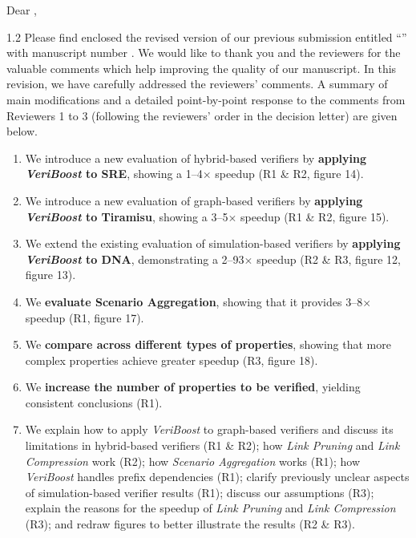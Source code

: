 Dear \printeditor,

\begin{spacing}{1.2}
Please find enclosed the revised version of our previous submission entitled \enquote{\printtitle} with manuscript number \printmanuscript.
We would like to thank you and the reviewers for the valuable comments which help improving the quality of our manuscript.
In this revision, we have carefully addressed the reviewers' comments.
A summary of main modifications and a detailed point-by-point response to the comments from Reviewers 1 to 3 (following the reviewers' order in the decision letter) are given below.


\begin{enumerate}[leftmargin=*, topsep=0pt, partopsep=0pt, itemsep=6pt, parsep=0pt]
    \item We introduce a new evaluation of hybrid-based verifiers by \textbf{applying \textit{VeriBoost} to SRE}, showing a 1--4$\times$ speedup (R1 \& R2, figure 14).

    \item We introduce a new evaluation of graph-based verifiers by \textbf{applying \textit{VeriBoost} to Tiramisu}, showing a 3--5$\times$ speedup (R1 \& R2, figure 15).

    \item We extend the existing evaluation of simulation-based verifiers by \textbf{applying \textit{VeriBoost} to DNA}, demonstrating a 2--93$\times$ speedup (R2 \& R3, figure 12, figure 13).

    \item We \textbf{evaluate Scenario Aggregation}, showing that it provides 3--8$\times$ speedup (R1, figure 17).

    \item We \textbf{compare across different types of properties}, showing that more complex properties achieve greater speedup (R3, figure 18).

    \item We \textbf{increase the number of properties to be verified}, yielding consistent conclusions (R1).

    \item We explain how to apply \textit{VeriBoost} to graph-based verifiers and discuss its limitations in hybrid-based verifiers (R1 \& R2); how \textit{Link Pruning} and \textit{Link Compression} work (R2); how \textit{Scenario Aggregation} works (R1); how \textit{VeriBoost} handles prefix dependencies (R1); clarify previously unclear aspects of simulation-based verifier results (R1); discuss our assumptions (R3); explain the reasons for the speedup of \textit{Link Pruning} and \textit{Link Compression} (R3); and redraw figures to better illustrate the results (R2 \& R3).
\end{enumerate}



\end{spacing}
